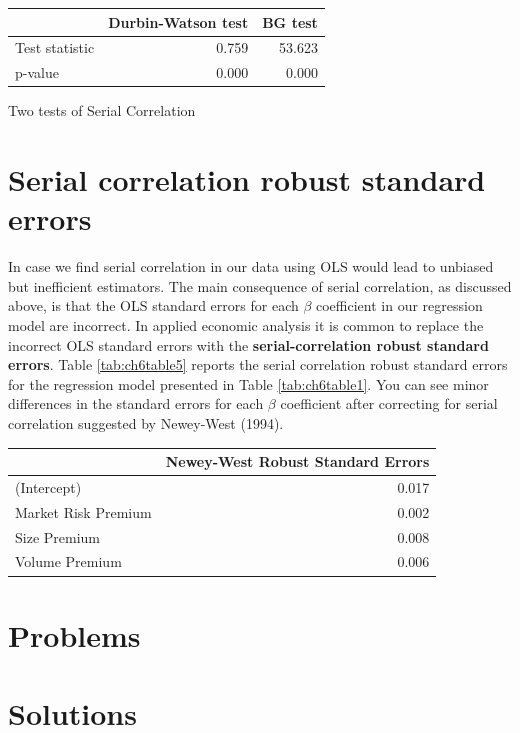 \documentclass[
]{book}
\theoremstyle{definition}
\theoremstyle{definition}
\theoremstyle{definition}
\theoremstyle{definition}
\theoremstyle{remark}
\begin{document}
\begin{tabular}{l|r|r}
\hline
  & Durbin-Watson test & BG test\\
\hline
Test statistic & 0.759 & 53.623\\
\hline
p-value & 0.000 & 0.000\\
\hline
\end{tabular}

\label{tab:ch6table4} Two tests of Serial Correlation

\hypertarget{serial-correlation-robust-standard-errors}{%
\section{Serial correlation robust standard errors}\label{serial-correlation-robust-standard-errors}}

In case we find serial correlation in our data using OLS would lead to unbiased but inefficient estimators. The main consequence of serial correlation, as discussed above, is that the OLS standard errors for each \(\beta\) coefficient in our regression model are incorrect. In applied economic analysis it is common to replace the incorrect OLS standard errors with the \textbf{serial-correlation robust standard errors}. Table \ref{tab:ch6table5} reports the serial correlation robust standard errors for the regression model presented in Table \ref{tab:ch6table1}. You can see minor differences in the standard errors for each \(\beta\) coefficient after correcting for serial correlation suggested by Newey-West (1994).

\begin{tabular}{l|r}
\hline
  & Newey-West Robust Standard Errors\\
\hline
(Intercept) & 0.017\\
\hline
Market Risk Premium & 0.002\\
\hline
Size Premium & 0.008\\
\hline
Volume Premium & 0.006\\
\hline
\end{tabular}

\hypertarget{problems-3}{%
\section*{Problems}\label{problems-3}}

\hypertarget{solutions-3}{%
\section*{Solutions}\label{solutions-3}}
\end{document}
